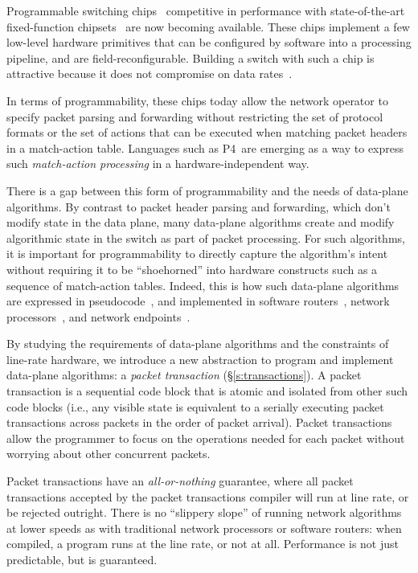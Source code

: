 Programmable switching chips~\cite{flexpipe, xpliant, tofino} competitive in performance with state-of-the-art
fixed-function chipsets~\cite{trident, tomahawk, mellanox} are now
becoming available. These chips implement a few low-level hardware
primitives that can be configured by software into a processing
pipeline, and are
field-reconfigurable. Building
a switch with such a chip is attractive because it does not compromise
on data rates~\cite{rmt}.

In terms of programmability, these chips today allow the network operator to
specify packet parsing and forwarding without restricting the set of protocol
formats or the set of actions that can be executed when matching packet headers
in a match-action table. Languages such as P4~\cite{p4,p4spec}are emerging as a
way to express such {\em match-action processing} in a hardware-independent
way.

There is a gap between this form of programmability and the needs of data-plane
algorithms. By contrast to packet header parsing and forwarding, which don't
modify state in the data plane, many data-plane algorithms create and modify
algorithmic state in the switch as part of packet processing. For such
algorithms, it is important for programmability to directly capture the
algorithm's intent without requiring it to be ``shoehorned'' into hardware
constructs such as a sequence of match-action tables. Indeed, this is how such
data-plane algorithms are expressed in pseudocode~\cite{red, codel_code}, and
implemented in software routers~\cite{click}, network
processors~\cite{packetc}, and network endpoints~\cite{qdisc}.

By studying the requirements of data-plane algorithms and the constraints of
line-rate hardware, we introduce a new abstraction to program and implement
data-plane algorithms: a {\em packet transaction} (\S\ref{s:transactions}). A
packet transaction is a sequential code block that is atomic and isolated from
other such code blocks (i.e., any visible state is equivalent to a serially
executing packet transactions across packets in the order of packet arrival).
Packet transactions allow the programmer to focus on the operations needed for
each packet without worrying about other concurrent packets.

Packet transactions have an \textit{all-or-nothing} guarantee, where all packet
transactions accepted by the packet transactions compiler will run at line
rate, or be rejected outright. There is no ``slippery slope'' of running
network algorithms at lower speeds as with traditional network processors or
software routers: when compiled, a \pktlanguage program runs at the line rate,
or not at all.  Performance is not just predictable, but is guaranteed.

